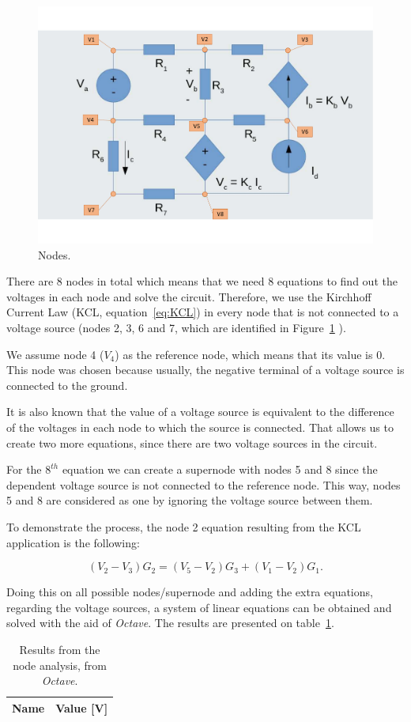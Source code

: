 \begin{figure}[H] \centering
    \includegraphics[width=0.8\linewidth]{Images/node analysis.pdf}
    \caption{Nodes.}
    \label{fig:Nodes}
\end{figure}

\indent

There are 8 nodes in total which means that we need 8 equations to find out the voltages in each node and solve the circuit. Therefore, we use the Kirchhoff Current Law (KCL, equation~\ref{eq:KCL}) in every node that is not connected to a voltage source (nodes 2, 3, 6 and 7, which are identified in Figure~\ref{fig:Nodes} ).

We assume node 4 ($V_4$) as the reference node, which means that its value is 0. This node was chosen because usually, the negative terminal of a voltage source is connected to the ground.

It is also known that the value of a voltage source is equivalent to the difference of the voltages in each node to which the source is connected. That allows us to create two more equations, since there are two voltage sources in the circuit.

For the $8^{th}$ equation we can create a supernode with nodes 5 and 8 since the dependent voltage source is not connected to the reference node. This way, nodes 5 and 8 are considered as one by ignoring the voltage source between them.

To demonstrate the process, the node 2 equation resulting from the KCL application is the following:

\begin{equation}
    (V_2-V_3)G_2=(V_5-V_2)G_3+(V_1-V_2)G_1.
\end{equation}

Doing this on all possible nodes/supernode and adding the extra equations, regarding the voltage sources, a system of linear equations can be obtained and solved with the aid of \textit{Octave}. The results are presented on table~\ref{tab:Volts}.

\begin{table}[h]
  \centering
  \begin{tabular}{|l|r|}
    \hline    
    {\bf Name} & {\bf Value [V]} \\ \hline
    
  \end{tabular}
  \caption{Results from the node analysis, from \textit{Octave}.}
  \label{tab:Volts}
\end{table}
